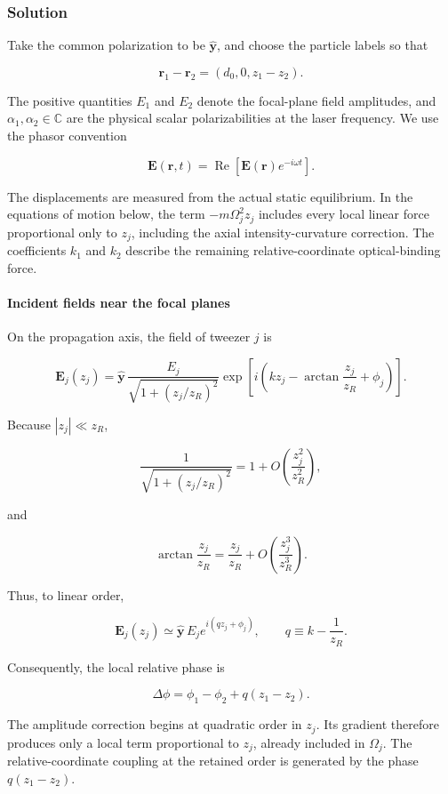 \subsubsection*{Solution}

Take the common polarization to be \(\hat{\mathbf y}\), and choose the
particle labels so that

\[
\mathbf r_1-\mathbf r_2=(d_0,0,z_1-z_2).
\]

The positive quantities \(E_1\) and \(E_2\) denote the focal-plane field
amplitudes, and \(\alpha_1,\alpha_2\in\mathbb C\) are the physical scalar
polarizabilities at the laser frequency.  We use the phasor convention

\[
\mathbf E(\mathbf r,t)=\operatorname{Re}\!\left[\mathbf E(\mathbf r)e^{-i\omega t}\right].
\]

The displacements are measured from the actual static equilibrium.  In the
equations of motion below, the term \(-m\Omega_j^2z_j\) includes every local
linear force proportional only to \(z_j\), including the axial
intensity-curvature correction.  The coefficients \(k_1\) and \(k_2\)
describe the remaining relative-coordinate optical-binding force.

\paragraph*{Incident fields near the focal planes}

On the propagation axis, the field of tweezer $j$ is

\[
\mathbf E_j(z_j) = \hat{\mathbf y}\, \frac{E_j}{\sqrt{1+(z_j/z_R)^2}} \exp\!\left[ i\left(kz_j-\arctan\frac{z_j}{z_R}+\phi_j\right) \right].
\]

Because $|z_j|\ll z_R$,

\[
\frac{1}{\sqrt{1+(z_j/z_R)^2}} =1+O\!\left(\frac{z_j^2}{z_R^2}\right),
\]

and

\[
\arctan\frac{z_j}{z_R} = \frac{z_j}{z_R} +O\!\left(\frac{z_j^3}{z_R^3}\right).
\]

Thus, to linear order,

\[
\mathbf E_j(z_j) \simeq \hat{\mathbf y}\,E_j e^{i(qz_j+\phi_j)}, \qquad q\equiv k-\frac{1}{z_R}.
\]

Consequently, the local relative phase is

\[
\Delta\phi = \phi_1-\phi_2+q(z_1-z_2).
\]

The amplitude correction begins at quadratic order in \(z_j\).  Its gradient
therefore produces only a local term proportional to \(z_j\), already included
in \(\Omega_j\).  The relative-coordinate coupling at the retained order is
generated by the phase \(q(z_1-z_2)\).

